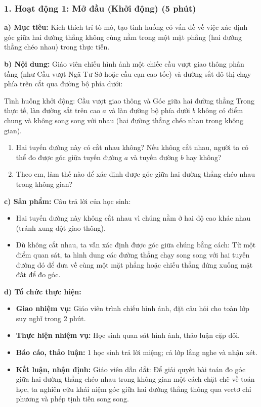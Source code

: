 \documentclass[12pt, a4paper]{article}
\begin{document}
\subsubsection*{1. Hoạt động 1: Mở đầu (Khởi động) (5 phút)}

\noindent \textbf{a) Mục tiêu:}
Kích thích trí tò mò, tạo tình huống có vấn đề về việc xác định góc giữa hai đường thẳng không cùng nằm trong một mặt phẳng (hai đường thẳng chéo nhau) trong thực tiễn.

\noindent \textbf{b) Nội dung:}
Giáo viên chiếu hình ảnh một chiếc cầu vượt giao thông phân tầng (như Cầu vượt Ngã Tư Sở hoặc cầu cạn cao tốc) và đường sắt đô thị chạy phía trên cắt qua đường bộ phía dưới:
\begin{pedabox}{Tình huống khởi động: Cầu vượt giao thông và Góc giữa hai đường thẳng}
Trong thực tế, làn đường sắt trên cao $a$ và làn đường bộ phía dưới $b$ không có điểm chung và không song song với nhau (hai đường thẳng chéo nhau trong không gian).
\begin{enumerate}[leftmargin=0.6cm]
    \item Hai tuyến đường này có cắt nhau không? Nếu không cắt nhau, người ta có thể đo được góc giữa tuyến đường $a$ và tuyến đường $b$ hay không?
    \item Theo em, làm thế nào để xác định được góc giữa hai đường thẳng chéo nhau trong không gian?
\end{enumerate}
\end{pedabox}

\noindent \textbf{c) Sản phẩm:}
Câu trả lời của học sinh:
\begin{itemize}
    \item Hai tuyến đường này không cắt nhau vì chúng nằm ở hai độ cao khác nhau (tránh xung đột giao thông).
    \item Dù không cắt nhau, ta vẫn xác định được góc giữa chúng bằng cách: Từ một điểm quan sát, ta hình dung các đường thẳng chạy song song với hai tuyến đường đó để đưa về cùng một mặt phẳng hoặc chiếu thẳng đứng xuống mặt đất để đo góc.
\end{itemize}

\noindent \textbf{d) Tổ chức thực hiện:}
\begin{itemize}[leftmargin=0.6cm]
    \item \textbf{Giao nhiệm vụ:} Giáo viên trình chiếu hình ảnh, đặt câu hỏi cho toàn lớp suy nghĩ trong 2 phút.
    \item \textbf{Thực hiện nhiệm vụ:} Học sinh quan sát hình ảnh, thảo luận cặp đôi.
    \item \textbf{Báo cáo, thảo luận:} 1 học sinh trả lời miệng; cả lớp lắng nghe và nhận xét.
    \item \textbf{Kết luận, nhận định:} Giáo viên dẫn dắt: Để giải quyết bài toán đo góc giữa hai đường thẳng chéo nhau trong không gian một cách chặt chẽ về toán học, ta nghiên cứu khái niệm góc giữa hai đường thẳng thông qua vectơ chỉ phương và phép tịnh tiến song song.
\end{itemize}
\end{document}
